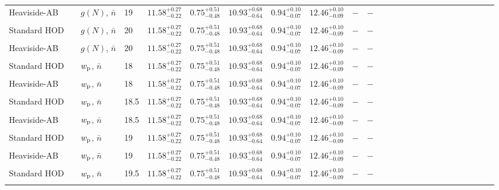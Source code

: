 \documentclass[12pt, preprint]{emulateapj}
\newcommand{\wpp}{w_{\rm p}}
\newcommand{\gmf}{g(N)}
\begin{document}
\begin{table*}
\begin{center}
\begin{tabular}{@{}lllllllllllllllllllllllll}
      Heaviside-AB & & $\gmf$, $\bar{n}$ & 19 & $11.58^{+0.27}_{-0.22}$ &  $0.75^{+0.51}_{-0.48}$ & $10.93^{+0.68}_{-0.64}$ & $0.94^{+0.10}_{-0.07}$ &  $12.46^{+0.10}_{-0.09}$ & $-$ & $-$ \\ \\
Standard HOD & & $\gmf$, $\bar{n}$ & 20 & $11.58^{+0.27}_{-0.22}$ &  $0.75^{+0.51}_{-0.48}$ & $10.93^{+0.68}_{-0.64}$ & $0.94^{+0.10}_{-0.07}$ &  $12.46^{+0.10}_{-0.09}$ & $-$ & $-$ \\ \\
       Heaviside-AB & & $\gmf$, $\bar{n}$ & 20 & $11.58^{+0.27}_{-0.22}$ &  $0.75^{+0.51}_{-0.48}$ & $10.93^{+0.68}_{-0.64}$ & $0.94^{+0.10}_{-0.07}$ &  $12.46^{+0.10}_{-0.09}$ & $-$ & $-$ \\ \\
Standard HOD & & $\wpp$, $\bar{n}$ & 18 & $11.58^{+0.27}_{-0.22}$ &  $0.75^{+0.51}_{-0.48}$ & $10.93^{+0.68}_{-0.64}$ & $0.94^{+0.10}_{-0.07}$ &  $12.46^{+0.10}_{-0.09}$ & $-$ & $-$ \\ \\
         Heaviside-AB & & $\wpp$, $\bar{n}$ & 18 & $11.58^{+0.27}_{-0.22}$ &  $0.75^{+0.51}_{-0.48}$ & $10.93^{+0.68}_{-0.64}$ & $0.94^{+0.10}_{-0.07}$ &  $12.46^{+0.10}_{-0.09}$ & $-$ & $-$ \\ \\
Standard HOD & & $\wpp$, $\bar{n}$ & 18.5 & $11.58^{+0.27}_{-0.22}$ &  $0.75^{+0.51}_{-0.48}$ & $10.93^{+0.68}_{-0.64}$ & $0.94^{+0.10}_{-0.07}$ &  $12.46^{+0.10}_{-0.09}$ & $-$ & $-$ \\ \\
           Heaviside-AB & & $\wpp$, $\bar{n}$ & 18.5 & $11.58^{+0.27}_{-0.22}$ &  $0.75^{+0.51}_{-0.48}$ & $10.93^{+0.68}_{-0.64}$ & $0.94^{+0.10}_{-0.07}$ &  $12.46^{+0.10}_{-0.09}$ & $-$ & $-$ \\ \\
Standard HOD & & $\wpp$, $\bar{n}$ & 19 & $11.58^{+0.27}_{-0.22}$ &  $0.75^{+0.51}_{-0.48}$ & $10.93^{+0.68}_{-0.64}$ & $0.94^{+0.10}_{-0.07}$ &  $12.46^{+0.10}_{-0.09}$ & $-$ & $-$ \\ \\
             Heaviside-AB & & $\wpp$, $\bar{n}$ & 19 & $11.58^{+0.27}_{-0.22}$ &  $0.75^{+0.51}_{-0.48}$ & $10.93^{+0.68}_{-0.64}$ & $0.94^{+0.10}_{-0.07}$ &  $12.46^{+0.10}_{-0.09}$ & $-$ & $-$ \\ \\
Standard HOD & & $\wpp$, $\bar{n}$ & 19.5 & $11.58^{+0.27}_{-0.22}$ &  $0.75^{+0.51}_{-0.48}$ & $10.93^{+0.68}_{-0.64}$ & $0.94^{+0.10}_{-0.07}$ &  $12.46^{+0.10}_{-0.09}$ & $-$ & $-$ \\ \\

\end{tabular}
\end{center}
\end{table*}
\end{document}
